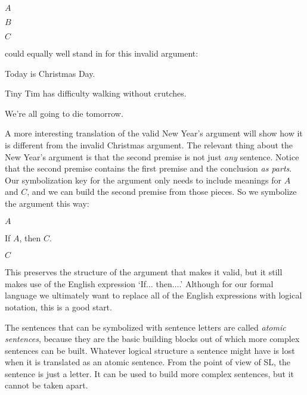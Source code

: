 \begin{earg}
\item[] $A$
\item[] $B$
\item[\therefore] $C$
\end{earg}

could equally well stand in for this invalid argument:

\begin{ekey}
\item[]Today is Christmas Day.
\item[]Tiny Tim has difficulty walking without crutches.
\item[\therefore]We're all going to die tomorrow.
\end{ekey}

A more interesting translation of the valid New Year's argument will show how it is different from the invalid Christmas argument. The relevant thing about the New Year's argument is that the second premise is not just \emph{any} sentence. Notice that the second premise contains the first premise and the conclusion \emph{as parts}. Our symbolization key for the argument only needs to include meanings for $A$ and $C$, and we can build the second premise from those pieces. So we symbolize the argument this way:
\begin{earg}
\item[] $A$
\item[] If $A$, then $C$.
\item[\therefore] $C$
\end{earg}
This preserves the structure of the argument that makes it valid, but it still makes use of the English expression `If$\ldots$ then$\ldots$.' Although for our formal language we ultimately want to replace all of the English expressions with logical notation, this is a good start.

The sentences that can be symbolized with sentence letters are called \emph{atomic sentences}, because they are the basic building blocks out of which more complex sentences can be built. Whatever logical structure a sentence might have is lost when it is translated as an atomic sentence. From the point of view of SL, the sentence is just a letter. It can be used to build more complex sentences, but it cannot be taken apart.



